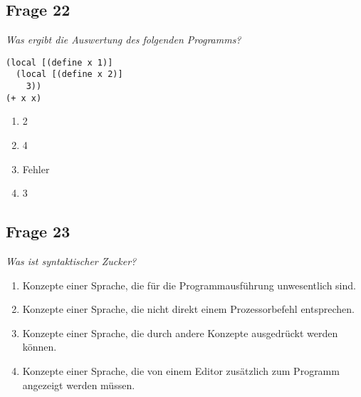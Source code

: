 \documentclass[a4paper, 11pt]{article}
\begin{document}
\subsection*{Frage 22}
\textit{Was ergibt die Auswertung des folgenden Programms?}
\begin{verbatim}
(local [(define x 1)]
  (local [(define x 2)]
    3))
(+ x x)
\end{verbatim}
\begin{enumerate}[label=$\square$]
	\item 2
	\item 4
	\item Fehler
	\item 3
\end{enumerate}

\subsection*{Frage 23}
\textit{Was ist syntaktischer Zucker?}
\begin{enumerate}[label=$\square$]
	\item Konzepte einer Sprache, die für die Programmausführung unwesentlich sind.
	\item Konzepte einer Sprache, die nicht direkt einem Prozessorbefehl entsprechen.
	\item Konzepte einer Sprache, die durch andere Konzepte ausgedrückt werden können.
	\item Konzepte einer Sprache, die von einem Editor zusätzlich zum Programm angezeigt werden müssen.
\end{enumerate}
\end{document}

